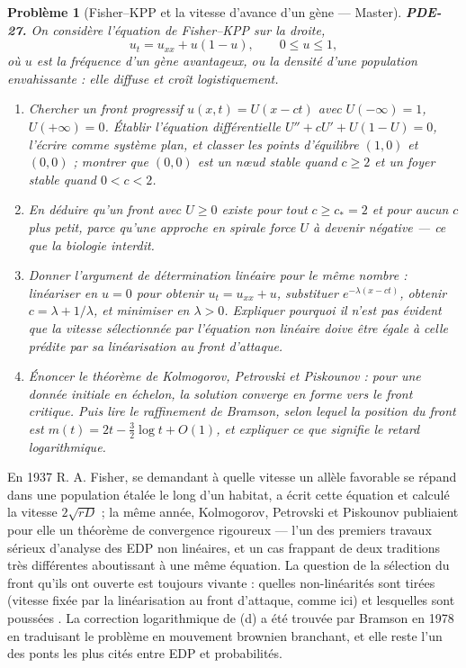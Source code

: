 \documentclass[11pt]{article}
\newtheorem{problem}{Problème}
\begin{document}
\bigskip

\begin{problem}[{Fisher--KPP et la vitesse d'avance d'un gène --- Master}]
\textbf{PDE-27.} On considère l'équation de Fisher--KPP sur la droite,
\[ u_t = u_{xx} + u(1-u), \qquad 0 \le u \le 1, \]
où $u$ est la fréquence d'un gène avantageux, ou la densité d'une population
envahissante : elle diffuse et croît logistiquement.
\begin{enumerate}
\item[(a)] Chercher un front progressif $u(x,t) = U(x-ct)$ avec $U(-\infty)=1$,
$U(+\infty)=0$. Établir l'équation différentielle $U'' + cU' + U(1-U) = 0$, l'écrire comme
système plan, et classer les points d'équilibre $(1,0)$ et $(0,0)$ ; montrer que
$(0,0)$ est un n\oe{}ud stable quand $c \ge 2$ et un foyer stable quand $0 < c < 2$.
\item[(b)] En déduire qu'un front avec $U \ge 0$ existe pour tout $c \ge c_* = 2$ et pour
aucun $c$ plus petit, parce qu'une approche en spirale force $U$ à devenir négative --- ce que
la biologie interdit.
\item[(c)] Donner l'argument de détermination linéaire pour le même nombre : linéariser en
$u = 0$ pour obtenir $u_t = u_{xx} + u$, substituer $e^{-\lambda(x-ct)}$, obtenir
$c = \lambda + 1/\lambda$, et minimiser en $\lambda > 0$. Expliquer pourquoi il n'est pas
évident que la vitesse sélectionnée par l'équation non linéaire doive être égale à celle
prédite par sa linéarisation au front d'attaque.
\item[(d)] Énoncer le théorème de Kolmogorov, Petrovski et Piskounov : pour une donnée initiale en
échelon, la solution converge en forme vers le front critique. Puis lire le raffinement de
Bramson, selon lequel la position du front est $m(t) = 2t - \tfrac32\log t + O(1)$, et
expliquer ce que signifie le retard logarithmique.
\end{enumerate}

\end{problem}

\noindent En 1937 R. A. Fisher, se demandant à quelle vitesse un allèle favorable se
répand dans une population étalée le long d'un habitat, a écrit cette équation et calculé
la vitesse $2\sqrt{rD}$ ; la même année, Kolmogorov, Petrovski et Piskounov
publiaient pour elle un théorème de convergence rigoureux --- l'un des premiers travaux sérieux
d'analyse des EDP non linéaires, et un cas frappant de deux traditions très différentes
aboutissant à une même équation. La question de la sélection du front qu'ils ont ouverte est
toujours vivante : quelles non-linéarités sont \og{} tirées \fg{} (vitesse fixée par la linéarisation au
front d'attaque, comme ici) et lesquelles sont \og{} poussées \fg{}. La correction logarithmique de
(d) a été trouvée par Bramson en 1978 en traduisant le problème en mouvement brownien branchant,
et elle reste l'un des ponts les plus cités entre EDP et probabilités.
\end{document}
